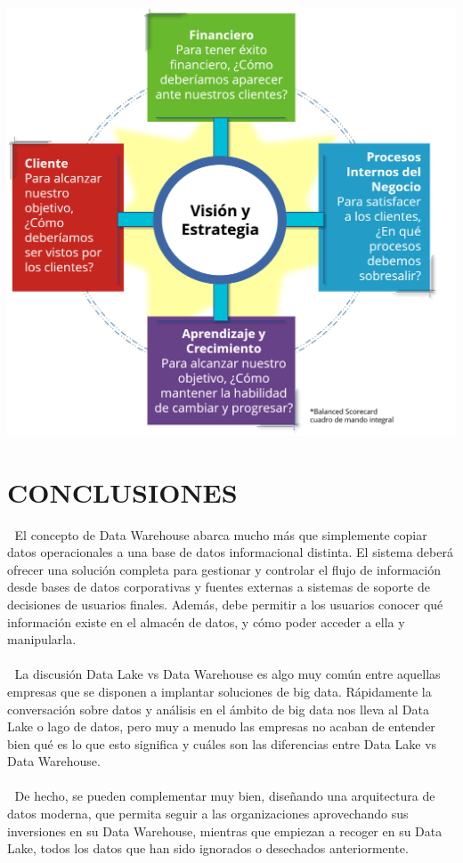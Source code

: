 \begin{center}
\includegraphics[width=14cm]{./Imagenes/imagen2}
\end{center}

\section{CONCLUSIONES}
\item{	El concepto de Data Warehouse abarca mucho más que simplemente copiar datos operacionales a una base de datos informacional distinta. El sistema deberá ofrecer una solución completa para gestionar y controlar el flujo de información desde bases de datos corporativas y fuentes externas a sistemas de soporte de decisiones de usuarios finales. Además, debe permitir a los usuarios conocer qué información existe en el almacén de datos, y cómo poder acceder a ella y manipularla.\\\\
	La discusión Data Lake vs Data Warehouse es algo muy común entre aquellas empresas que se disponen a implantar soluciones de big data. Rápidamente la conversación sobre datos y análisis en el ámbito de big data nos lleva al Data Lake o lago de datos, pero muy a menudo las empresas no acaban de entender bien qué es lo que esto significa y cuáles son las diferencias entre Data Lake vs Data Warehouse.\\\\
	De hecho, se pueden complementar muy bien, diseñando una arquitectura de datos moderna, que permita seguir a las organizaciones aprovechando sus inversiones en su Data Warehouse, mientras que empiezan a recoger en su Data Lake, todos los datos que han sido ignorados o desechados anteriormente.
}

